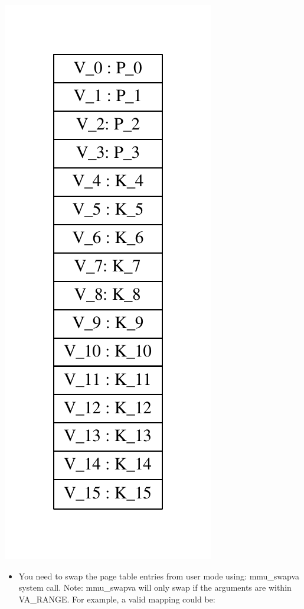 \documentclass[]{article}
\providecommand{\tightlist}{%
  \setlength{\itemsep}{0pt}\setlength{\parskip}{0pt}}
\begin{document}
\includegraphics{graphviz-images/afbaf87825d4f41b0369cc3d97ea36d4719d0d00.pdf}

\begin{itemize}
\tightlist
\item
  You need to swap the page table entries from user mode using:
  mmu\_swapva system call. Note: mmu\_swapva will only swap if the
  arguments are within VA\_RANGE. For example, a valid mapping could be:
\end{itemize}
\end{document}
